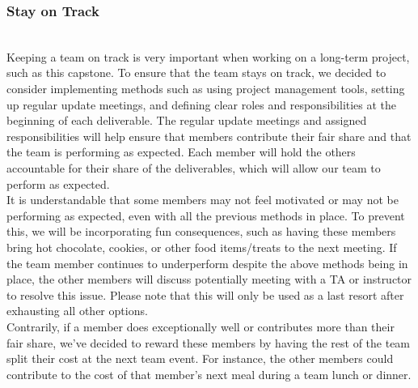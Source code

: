 \documentclass{article}
\begin{document}
\subsubsection*{Stay on Track}



 \\

Keeping a team on track is very important when working on a long-term project,
 such as this capstone. To ensure that the team stays on track, we decided to
 consider implementing methods such as using project management tools, setting
 up regular update meetings, and defining clear roles and responsibilities at
 the beginning of each deliverable. The regular update meetings and assigned
 responsibilities will help ensure that members contribute their fair share 
 and that the team is performing as expected. Each member will hold the others
 accountable for their share of the deliverables, which will allow our team 
 to perform as expected. \\

It is understandable that some members may not feel motivated or may not be
 performing as expected, even with all the previous methods in place.
 To prevent this, we will be incorporating fun consequences,
 such as having these members bring hot chocolate, cookies,
 or other food items/treats to the next meeting.
 If the team member continues to underperform despite the above
 methods being in place, the other members will discuss potentially 
 meeting with a TA or instructor to resolve this issue. 
 Please note that this will only be used as a last
 resort after exhausting all other options. \\

Contrarily, if a member does exceptionally well or contributes more 
than their fair share, we’ve decided to reward these members by having 
the rest of the team split their cost at the next team event. 
For instance, the other members could contribute to the cost of 
that member’s next meal during a team lunch or dinner. \\
\end{document}
